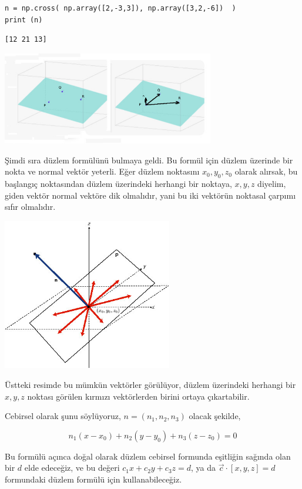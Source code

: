 \documentclass[12pt,fleqn]{article}\usepackage{../../common}
\begin{document}
\begin{verbatim}
n = np.cross( np.array([2,-3,3]), np.array([3,2,-6])  )
print (n)
\end{verbatim}

\begin{verbatim}
[12 21 13]
\end{verbatim}

\includegraphics[width=25em]{4_8.jpg}

Şimdi sıra düzlem formülünü bulmaya geldi. Bu formül için düzlem üzerinde bir
nokta ve normal vektör yeterli. Eğer düzlem noktasını $x_0,y_0,z_0$ olarak
alırsak, bu başlangıç noktasından düzlem üzerindeki herhangi bir noktaya,
$x,y,z$ diyelim, giden vektör normal vektöre dik olmalıdır, yani bu iki
vektörün noktasal çarpımı sıfır olmalıdır.

\includegraphics[width=20em]{4_7.jpg}

Üstteki resimde bu mümkün vektörler görülüyor, düzlem üzerindeki herhangi bir
$x,y,z$ noktası görülen kırmızı vektörlerden birini ortaya çıkartabilir.

Cebirsel olarak şunu söylüyoruz, $n = (n_1,n_2,n_3)$ olacak şekilde,

$$
n_1 (x - x_0) + n_2 (y-y_0) + n_3 (z-z_0) = 0
$$

Bu formülü açınca doğal olarak düzlem cebirsel formunda eşitliğin sağında olan
bir $d$ elde edeceğiz, ve bu değeri $c_1 x + c_2 y + c_3 z = d$, ya da
$\vec{c} \cdot [x,y,z] = d$ formundaki düzlem formülü için kullanabileceğiz.
\end{document}
